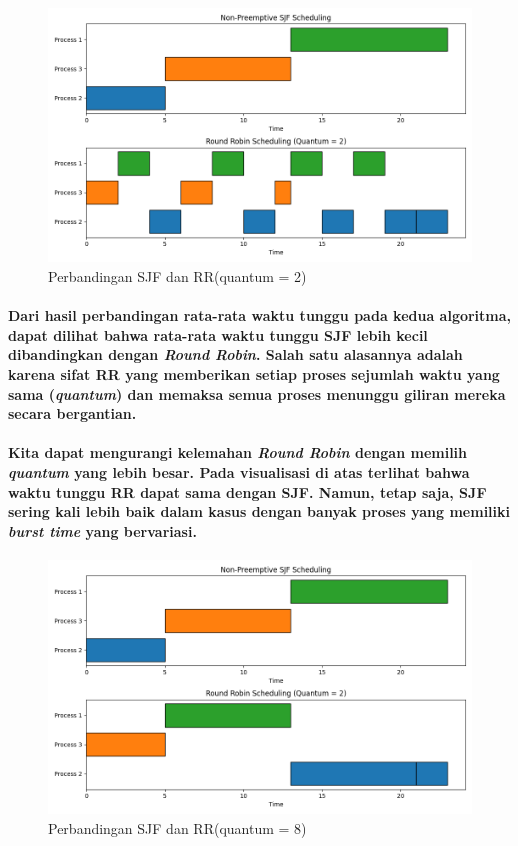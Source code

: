 \documentclass[12pt]{article}
\begin{document}
\begin{figure}[H]
    \centering
    \includegraphics[width=1\linewidth]{asset/411.png}
    \caption{Perbandingan SJF dan RR(quantum = 2)}
\end{figure}

\paragraph{
    \hspace*{1cm} Dari hasil perbandingan rata-rata waktu tunggu pada kedua algoritma, dapat dilihat bahwa rata-rata waktu tunggu SJF lebih kecil dibandingkan dengan \textit{Round Robin}. Salah satu alasannya adalah karena sifat RR yang memberikan setiap proses sejumlah waktu yang sama (\textit{quantum}) dan memaksa semua proses menunggu giliran mereka secara bergantian. 
}

\paragraph{
    \hspace*{1cm} Kita dapat mengurangi kelemahan \textit{Round Robin} dengan memilih \textit{quantum} yang lebih besar. Pada visualisasi di atas terlihat bahwa waktu tunggu RR dapat sama dengan SJF. Namun, tetap saja, SJF sering kali lebih baik dalam kasus dengan banyak proses yang memiliki \textit{burst time} yang bervariasi.
}

\begin{figure}[H]
    \centering
    \includegraphics[width=1\linewidth]{asset/412.png}
    \caption{Perbandingan SJF dan RR(quantum = 8)}
\end{figure}
\end{document}
